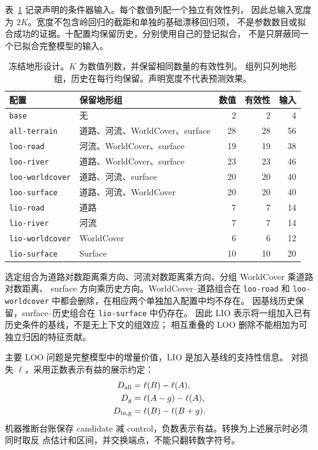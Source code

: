 表~\ref{tab:terrain-design} 记录声明的条件器输入。每个数值列配一个独立有效性列，
因此总输入宽度为 \(2K\)。宽度不包含岭回归的截距和单独的基础漂移回归项，
不是参数数目或拟合成功的证据。十配置均保留历史，分别使用自己的登记拟合，
不是只屏蔽同一个已拟合完整模型的输入。

\begin{table}[htbp]
\centering\small
\caption{冻结地形设计。\(K\) 为数值列数，并保留相同数量的有效性列。
组列只列地形组，历史在每行均保留。声明宽度不代表预测效果。}
\label{tab:terrain-design}\hypertarget{tab:terrain-design}{}
\begin{tabular}{p{.24\linewidth}p{.35\linewidth}rrr}
\toprule
配置 & 保留地形组 & 数值 & 有效性 & 输入\\
\midrule
\texttt{base} & 无 & 2 & 2 & 4\\
\texttt{all-terrain} & 道路、河流、WorldCover、surface & 28 & 28 & 56\\
\texttt{loo-road} & 河流、WorldCover、surface & 19 & 19 & 38\\
\texttt{loo-river} & 道路、WorldCover、surface & 23 & 23 & 46\\
\texttt{loo-worldcover} & 道路、河流、surface & 20 & 20 & 40\\
\texttt{loo-surface} & 道路、河流、WorldCover & 20 & 20 & 40\\
\texttt{lio-road} & 道路 & 7 & 7 & 14\\
\texttt{lio-river} & 河流 & 7 & 7 & 14\\
\texttt{lio-worldcover} & WorldCover & 6 & 6 & 12\\
\texttt{lio-surface} & Surface & 10 & 10 & 20\\
\bottomrule
\end{tabular}
\end{table}

选定组合为道路对数距离乘方向、河流对数距离乘方向、分组 WorldCover 乘道路对数距离、
surface 方向乘历史方向。WorldCover--道路组合在 \texttt{loo-road} 和
\texttt{loo-worldcover} 中都会删除，在相应两个单独加入配置中均不存在。
因基线历史保留，surface--历史组合在 \texttt{lio-surface} 中仍存在。
因此 LIO 表示将一组加入已有历史条件的基线，不是无上下文的组效应；
相互重叠的 LOO 删除不能相加为可独立归因的特征贡献。

主要 LOO 问题是完整模型中的增量价值，LIO 是加入基线的支持性信息。
对损失 \(\ell\)，采用正数表示有益的展示约定：
\begin{align}
D_{\rm all}&=\ell(B)-\ell(A),\\
D_g&=\ell(A-g)-\ell(A),\\
D_{\rm in,g}&=\ell(B)-\ell(B+g).
\end{align}
机器推断台账保存 candidate 减 control，负数表示有益。转换为上述展示时必须同时取反
点估计和区间，并交换端点，不能只翻转数字符号。

